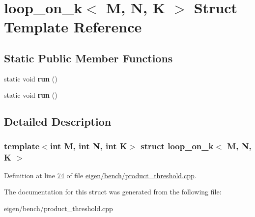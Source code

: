 \hypertarget{structloop__on__k}{}\section{loop\+\_\+on\+\_\+k$<$ M, N, K $>$ Struct Template Reference}
\label{structloop__on__k}
\subsection*{Static Public Member Functions}
\begin{DoxyCompactItemize}
\item 
\mbox{\label{structloop__on__k_a4b8d2b5597f1b6b17c70ab298d957319}} 
static void {\bfseries run} ()
\item 
\mbox{\label{structloop__on__k_a4b8d2b5597f1b6b17c70ab298d957319}} 
static void {\bfseries run} ()
\end{DoxyCompactItemize}


\subsection{Detailed Description}
\subsubsection*{template$<$int M, int N, int K$>$\newline
struct loop\+\_\+on\+\_\+k$<$ M, N, K $>$}



Definition at line \hyperlink{eigen_2bench_2product__threshold_8cpp_source_l00074}{74} of file \hyperlink{eigen_2bench_2product__threshold_8cpp_source}{eigen/bench/product\+\_\+threshold.\+cpp}.



The documentation for this struct was generated from the following file\+:\begin{DoxyCompactItemize}
\item 
eigen/bench/product\+\_\+threshold.\+cpp\end{DoxyCompactItemize}
